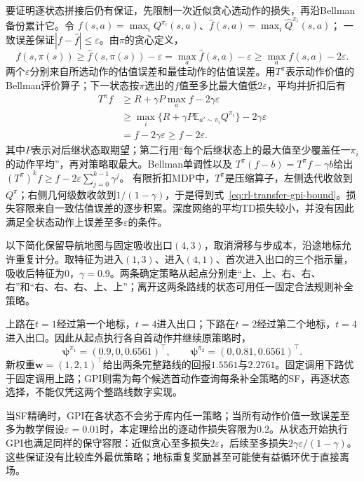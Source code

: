 要证明逐状态拼接后仍有保证，先限制一次近似贪心选动作的损失，再沿Bellman备份累计它。令
$f(s,a)=\max_iQ^{\pi_i}(s,a)$、$\widehat f(s,a)=\max_i\widehat Q^{\pi_i}(s,a)$；
一致误差保证$|f-\widehat f|\leq\varepsilon$。由$\pi$的贪心定义，
\[
 f(s,\pi(s))\geq\widehat f(s,\pi(s))-\varepsilon
 =\max_a\widehat f(s,a)-\varepsilon
 \geq\max_a f(s,a)-2\varepsilon.
\]
两个$\varepsilon$分别来自所选动作的估值误差和最佳动作的估值误差。用$T^\pi$表示动作价值的Bellman评价算子；下一状态按$\pi$选出的$f$值至多比最大值低$2\varepsilon$，平均并折扣后有
\begin{align*}
 T^\pi f
 &\geq R+\gamma P\max_a f-2\gamma\varepsilon\\
 &\geq \max_i\{R+\gamma P\mathbb E_{a'\sim\pi_i}Q^{\pi_i}\}
           -2\gamma\varepsilon\\
 &=f-2\gamma\varepsilon\geq f-2\varepsilon.
\end{align*}
其中$P$表示对后继状态取期望；第二行用“每个后继状态上的最大值至少覆盖任一$\pi_i$的动作平均”，再对策略取最大。Bellman单调性以及
$T^\pi(f-b)=T^\pi f-\gamma b$给出
$(T^\pi)^k f\geq f-2\varepsilon\sum_{j=0}^{k-1}\gamma^j$。
有限折扣MDP中，$T^\pi$是压缩算子，左侧迭代收敛到$Q^\pi$；右侧几何级数收敛到$1/(1-\gamma)$，于是得到式~\eqref{eq:rl-transfer-gpi-bound}。损失容限来自一致估值误差的逐步积累。深度网络的平均TD损失较小，并没有因此满足全状态动作上误差至多$\varepsilon$的条件。

\begin{example}[两条绕障策略的新奖励评价]
 \label{ex:rl-transfer-sf-routes}
 以下简化保留导航地图与固定吸收出口$(4,3)$，取消滑移与步成本，沿途地标允许重复计分。取特征为进入$(1,3)$、进入$(4,1)$、首次进入出口的三个指示量，吸收后特征为0，$\gamma=0.9$。两条确定策略从起点分别走“上、上、右、右、右”和“右、右、右、上、上”；离开这两条路线的状态可用任一固定合法规则补全策略。

 上路在$t=1$经过第一个地标，$t=4$进入出口；下路在$t=2$经过第二个地标，$t=4$进入出口。因此从起点执行各自首动作并继续原策略时，
 \[
 \bm\psi^{\pi_1}=(0.9,0,0.6561)^\top,\qquad
 \bm\psi^{\pi_2}=(0,0.81,0.6561)^\top.
 \]
 新权重$\bm w=(1,2,1)^\top$给出两条完整路线的回报$1.5561$与$2.2761$。固定调用下路优于固定调用上路；GPI则需为每个候选首动作查询每条补全策略的SF，再逐状态选择，不能仅凭这两个整路线数字实现。

 当SF精确时，GPI在各状态不会劣于库内任一策略；当所有动作价值一致误差至多为教学假设$\varepsilon=0.01$时，本定理给出的逐动作损失容限为$0.2$。从状态开始执行GPI也满足同样的保守容限：近似贪心至多损失$2\varepsilon$，后续至多损失$2\gamma\varepsilon/(1-\gamma)$。这些保证没有比较库外最优策略；地标重复奖励甚至可能使有益循环优于直接离场。
\end{example}


